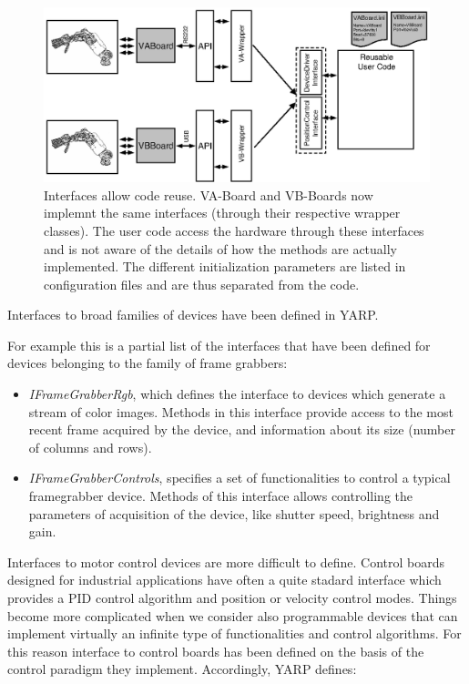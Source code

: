 \begin{figure}[tbp]
\centerline{
\includegraphics[width=24cm]{fig-devices2.eps}
}
\caption{Interfaces allow code reuse. VA-Board and VB-Boards now implemnt
the same interfaces (through their respective wrapper classes). The user 
code access the hardware through these interfaces and is not aware of 
the details of how the methods are actually implemented. The different 
initialization parameters are listed in configuration files and are thus 
separated from the code.}\label{fig:devices2}
\end{figure}

Interfaces to broad families of devices have been defined in YARP. 

For example this is a partial list of the interfaces that have been defined for 
devices belonging to the family of frame grabbers:

\begin{itemize}

\item \emph{IFrameGrabberRgb}, which defines the interface to devices which generate 
a stream of color images. Methods in this interface provide access to the most 
recent frame acquired by the device, and information about its size (number of 
columns and rows).

\item \emph{IFrameGrabberControls}, specifies a set of functionalities to control 
a typical framegrabber device. Methods of this interface allows controlling the 
parameters of acquisition of the device, like shutter speed, brightness and gain.

\end{itemize}

Interfaces to motor control devices are more difficult to define. Control boards 
designed for industrial applications have often a quite stadard interface which 
provides a PID control algorithm and position or velocity control modes. Things 
become more complicated when we consider also programmable devices that can 
implement virtually an infinite type of functionalities and control algorithms. 
For this reason interface to control boards has been defined on the basis of 
the control paradigm they implement. Accordingly, YARP defines:

